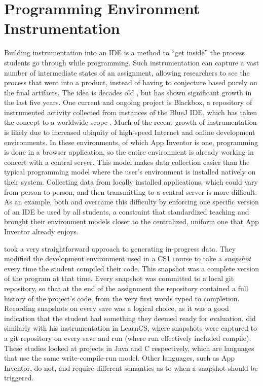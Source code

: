 \section{Programming Environment Instrumentation}
Building instrumentation into an IDE is a method to ``get inside'' the process students go through while programming. Such instrumentation can capture a vast number of intermediate states of an assignment, allowing researchers to see the process that went into a product, instead of having to conjecture based purely on the final artifacts. The idea is decades old \citep{spohrer1985goal}, but has shown significant growth in the last five years. One current and ongoing project is Blackbox, a repository of instrumented activity collected from instances of the BlueJ IDE, which has taken the concept to a worldwide scope \citep{brown2014blackbox}. Much of the recent growth of instrumentation is likely due to increased ubiquity of high-speed Internet and online development environments. In these environments, of which App Inventor is one, programming is done in a browser application, so the entire environment is already working in concert with a central server. This model makes data collection easier than the typical programming model where the user's environment is installed natively on their system. Collecting data from locally installed applications, which could vary from person to person, and then transmitting to a central server is more difficult. As an example, both \citet{piech-2012} and \citet{brown2014blackbox} overcame this difficulty by enforcing one specific version of an IDE be used by all students, a constraint that standardized teaching and brought their environment models closer to the centralized, uniform one that App Inventor already enjoys.

\citet{piech-2012} took a very straightforward approach to generating in-progress data. They modified the development environment used in a CS1 course to take a \emph{snapshot} every time the student compiled their code. This snapshot was a complete version of the program at that time. Every snapshot was committed to a local git repository, so that at the end of the assignment the repository contained a full history of the project's code, from the very first words typed to completion. Recording snapshots on every save was a logical choice, as it was a good indication that the student had something they deemed ready for evaluation. \citet{lipman-phd} did similarly with his instrumentation in LearnCS, where snapshots were captured to a git repository on every save and run (where run effectively included compile). These studies looked at projects in Java and C respectively, which are languages that use the same write-compile-run model. Other languages, such as App Inventor, do not, and require different semantics as to when a snapshot should be triggered.

